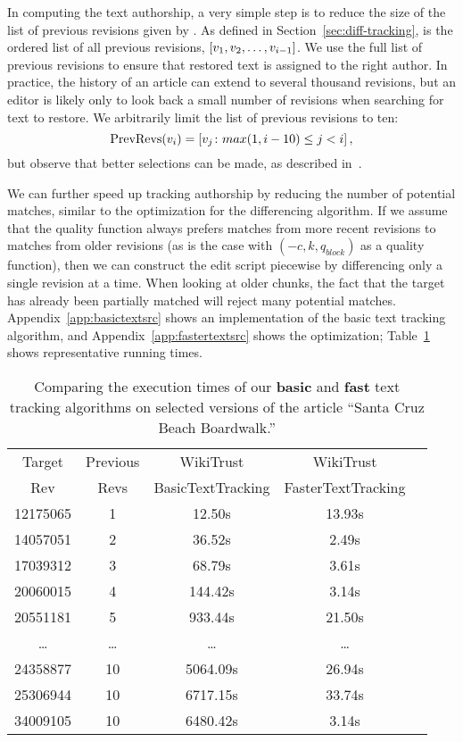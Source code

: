 In computing the text authorship,
a very simple step is to reduce the size of the list of
previous revisions given by .
As defined in Section~\ref{sec:diff-tracking},  
is the ordered list of all previous revisions,
$\left[ v_{1}, v_{2}, \ldots, v_{i-1} \right]$.
We use the full list of previous revisions to ensure that restored text
is assigned to the right author.
In practice, the history of an article can extend to several thousand
revisions, but an editor is likely only to look back a small number
of revisions when searching for text to restore.
We arbitrarily limit the list of previous revisions to ten:
\begin{equation*}
    \mathrm{PrevRevs}(v_{i}) = \left[ v_{j} \colon
	max(1,i-10) \le j < i \right],
\end{equation*}
but observe that better selections can be made, as described
in~\cite{Chatterjee2008}.

We can further speed up tracking authorship by reducing the number
of potential matches, similar to the optimization for the differencing
algorithm.
If we assume that the quality function always prefers matches from
more recent revisions to matches from older revisions
(as is the case with $(-c, k, q_{block})$ as a quality function),
then we can construct the edit script piecewise by differencing
only a single revision at a time.
When looking at older chunks, the fact that the target has already
been partially matched will reject many potential matches.
Appendix~\ref{app:basictextsrc} shows an implementation of the
basic text tracking algorithm, and Appendix~\ref{app:fastertextsrc}
shows the optimization; Table~\ref{tab:comparetext} shows representative
running times.

\begin{table}
\begin{center}
\begin{tabular}{| c | c || c || c | c |}
\hline
Target & Previous & WikiTrust & WikiTrust \\
Rev & Revs & BasicTextTracking & FasterTextTracking \\
\hline
12175065 & 1 & 12.50s & 13.93s \\
14057051 & 2 & 36.52s & 2.49s \\
17039312 & 3 & 68.79s & 3.61s \\
20060015 & 4 & 144.42s & 3.14s \\
20551181 & 5 & 933.44s & 21.50s \\
\ldots & \ldots & \ldots & \ldots \\
24358877 & 10 & 5064.09s & 26.94s \\
25306944 & 10 & 6717.15s & 33.74s \\
34009105 & 10 & 6480.42s & 3.14s \\
\hline
\end{tabular}
\end{center}
\caption[Comparing execution times of our two
    text tracking algorithms.]{Comparing the execution times of our
    \textbf{basic} and \textbf{fast} text tracking
    algorithms on selected versions of the article
    ``Santa Cruz Beach Boardwalk.''}
\label{tab:comparetext}
\end{table}


